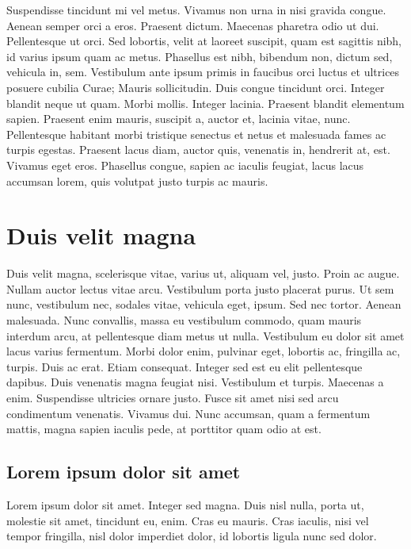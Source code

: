 \documentclass[../hdr.tex]{subfiles}
\begin{document}
Suspendisse tincidunt mi vel metus. Vivamus non urna in nisi gravida congue.
Aenean semper orci a eros. Praesent dictum. Maecenas pharetra odio ut dui.
Pellentesque ut orci. Sed lobortis, velit at laoreet suscipit, quam est sagittis
nibh, id varius ipsum quam ac metus. Phasellus est nibh, bibendum non, dictum
sed, vehicula in, sem. Vestibulum ante ipsum primis in faucibus orci luctus et
ultrices posuere cubilia Curae; Mauris sollicitudin. Duis congue tincidunt orci.
Integer blandit neque ut quam. Morbi mollis. Integer lacinia. Praesent blandit
elementum sapien. Praesent enim mauris, suscipit a, auctor et, lacinia vitae,
nunc. Pellentesque habitant morbi tristique senectus et netus et malesuada fames
ac turpis egestas. Praesent lacus diam, auctor quis, venenatis in, hendrerit at,
est. Vivamus eget eros. Phasellus congue, sapien ac iaculis feugiat, lacus lacus
accumsan lorem, quis volutpat justo turpis ac mauris.

\section{Duis velit magna}

Duis velit magna, scelerisque vitae, varius ut, aliquam vel, justo. Proin ac
augue. Nullam auctor lectus vitae arcu. Vestibulum porta justo placerat purus.
Ut sem nunc, vestibulum nec, sodales vitae, vehicula eget, ipsum. Sed nec
tortor. Aenean malesuada. Nunc convallis, massa eu vestibulum commodo, quam
mauris interdum arcu, at pellentesque diam metus ut nulla. Vestibulum eu dolor
sit amet lacus varius fermentum. Morbi dolor enim, pulvinar eget, lobortis ac,
fringilla ac, turpis. Duis ac erat. Etiam consequat. Integer sed est eu elit
pellentesque dapibus. Duis venenatis magna feugiat nisi. Vestibulum et turpis.
Maecenas a enim. Suspendisse ultricies ornare justo. Fusce sit amet nisi sed
arcu condimentum venenatis. Vivamus dui. Nunc accumsan, quam a fermentum mattis,
magna sapien iaculis pede, at porttitor quam odio at est.

\subsection{Lorem ipsum dolor sit amet}

Lorem ipsum dolor sit amet. Integer sed magna. Duis nisl nulla, porta ut,
molestie sit amet, tincidunt eu, enim. Cras eu mauris. Cras iaculis, nisi vel
tempor fringilla, nisl dolor imperdiet dolor, id lobortis ligula nunc sed dolor.
\end{document}
